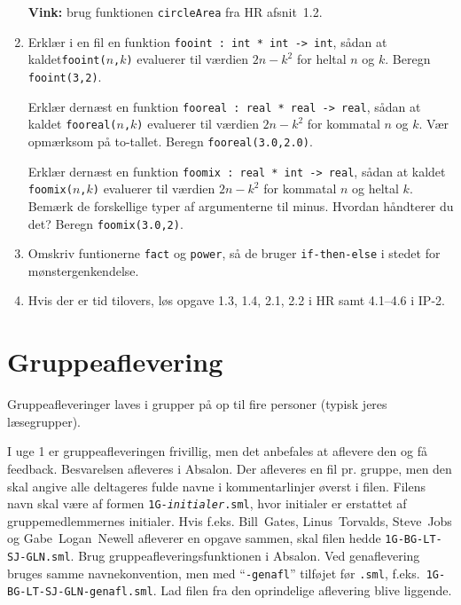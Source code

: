 \documentclass[a4paper,12pt]{article}
\begin{document}
\begin{enumerate}[{1}T1]
  \textbf{Vink:} brug funktionen \verb|circleArea| fra HR afsnit~1.2.
\item Erklær i en fil en funktion \verb|fooint : int * int -> int|,
  sådan at kaldet\newline \texttt{fooint($n$,$k$)} evaluerer til værdien $2n - k^2$ for heltal
  $n$ og $k$. Beregn \verb|fooint(3,2)|.

  Erklær dernæst en funktion \verb|fooreal : real * real -> real|,
  sådan at kaldet \texttt{fooreal($n$,$k$)} evaluerer til værdien $2n-k^2$
  for kommatal $n$ og $k$. Vær opmærksom på to-tallet. Beregn
  \verb|fooreal(3.0,2.0)|.

  Erklær dernæst en funktion \verb|foomix : real * int -> real|, sådan
  at kaldet \texttt{foomix($n$,$k$)} evaluerer til værdien $2n - k^2$ for
  kommatal $n$ og heltal $k$. Bemærk de forskellige typer af argumenterne
  til minus. Hvordan håndterer du det? Beregn \verb|foomix(3.0,2)|.

\item Omskriv funtionerne \texttt{fact} og \texttt{power}, så de
  bruger \texttt{if-then-else} i stedet for mønstergenkendelse.

\item Hvis der er tid tilovers, løs opgave 1.3, 1.4, 2.1, 2.2 i
  HR samt 4.1--4.6 i IP-2.
\end{enumerate}

\section{Gruppeaflevering}
\label{sec:gruppeaflevering}

Gruppeafleveringer laves i grupper på op til fire personer (typisk
jeres læsegrupper).

I uge 1 er gruppeafleveringen frivillig, men det anbefales at aflevere
den og få feedback. Besvarelsen afleveres i Absalon. Der afleveres en
fil pr. gruppe, men den skal angive alle deltageres fulde navne i
kommentarlinjer øverst i filen. Filens navn skal være af formen
\texttt{1G-\textit{initialer}.sml}, hvor initialer er erstattet af
gruppemedlemmernes initialer. Hvis f.eks. Bill~Gates, Linus~Torvalds,
Steve~Jobs og Gabe~Logan~Newell afleverer en opgave sammen, skal filen
hedde \texttt{1G-BG-LT-SJ-GLN.sml}. Brug gruppeafleveringsfunktionen i
Absalon.  Ved genaflevering bruges samme navnekonvention, men med
``\texttt{-genafl}'' tilføjet før \texttt{.sml},
f.eks.\ \texttt{1G-BG-LT-SJ-GLN-genafl.sml}.  Lad filen fra den
oprindelige aflevering blive liggende.
\end{document}

